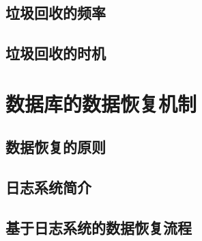 \subsection{垃圾回收的频率}

\subsection{垃圾回收的时机}

\section{数据库的数据恢复机制}

\subsection{数据恢复的原则}

\subsection{日志系统简介}

\subsection{基于日志系统的数据恢复流程}


